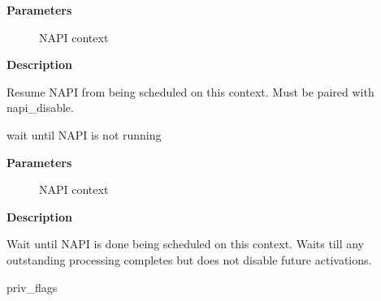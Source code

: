 \documentclass[a4paper,8pt,english]{sphinxmanual}
\begin{document}
\textbf{Parameters}
\begin{description}
\item[{}] \leavevmode
NAPI context

\end{description}

\textbf{Description}

Resume NAPI from being scheduled on this context.
Must be paired with napi\_disable.

\begin{fulllineitems}
\label{networking/kapi:c.napi_synchronize}
wait until NAPI is not running

\end{fulllineitems}


\textbf{Parameters}
\begin{description}
\item[{}] \leavevmode
NAPI context

\end{description}

\textbf{Description}

Wait until NAPI is done being scheduled on this context.
Waits till any outstanding processing completes but
does not disable future activations.

\begin{fulllineitems}
\label{networking/kapi:c.netdev_priv_flags}
{\hyperref[networking/kapi:c.net_device]{\emph{}}} priv\_flags

\end{fulllineitems}
\end{document}
